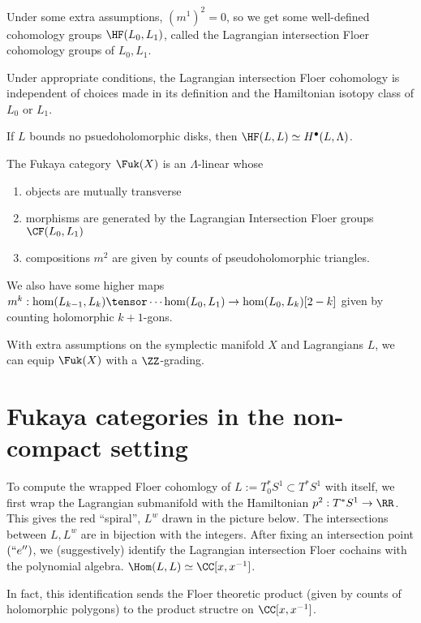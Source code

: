 Under some extra assumptions, $(m^1)^2=0$, so we get some well-defined cohomology groups $\HF(L_0, L_1)$, called the Lagrangian intersection Floer cohomology groups of $L_0, L_1$. 
\begin{theorem}
Under appropriate conditions, the Lagrangian intersection Floer cohomology is independent of choices made in its definition and the Hamiltonian isotopy class of $L_0$ or $L_1$.
\end{theorem}
\begin{theorem}
If $L$ bounds no psuedoholomorphic disks, then $\HF(L, L)\simeq H^\bullet(L, \Lambda)$. 
\end{theorem}
\begin{definition}
The Fukaya category $\Fuk(X)$ is an $\Lambda$-linear  whose 
\begin{enumerate}
\item objects are mutually transverse  
\item morphisms are generated by the Lagrangian Intersection Floer groups  $\CF(L_0, L_1 )$
\item compositions $m^2$ are given by counts of pseudoholomorphic triangles.
\end{enumerate}
We also have some higher maps $m^k: \hom(L_{k-1}, L_k)\tensor \cdots \hom(L_0, L_1)\to \hom(L_0, L_k)[2-k]$ given by counting holomorphic $k+1$-gons. 
\end{definition}
With extra assumptions on the symplectic manifold $X$ and Lagrangians $L$, we can equip $\Fuk(X)$ with a $\ZZ$-grading. 

\section{Fukaya categories in the non-compact setting}






\begin{example}
  \label{ex:wrappedFloerCohomology}
  To compute the wrapped Floer cohomlogy of $L:=T^*_0S^1\subset T^*S^1$ with itself, we first wrap the Lagrangian submanifold with the Hamiltonian $p^2: T^*S^1\to \RR$. This gives the red ``spiral'', $L^w$ drawn in the picture below. The intersections between $L, L^w$ are in bijection with the integers. After fixing an intersection point $(`` e'')$, we (suggestively) identify the Lagrangian intersection Floer cochains with the polynomial algebra. $\Hom(L, L)\simeq \CC[x, x^{-1}]$. 
  
  In fact, this identification sends the Floer theoretic product (given by counts of holomorphic polygons) to the product structre on $\CC[x, x^{-1}]$. 
\end{example}

